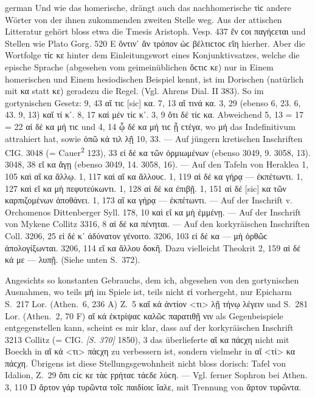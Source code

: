 \begin{otherlanguage*}{german}
Und wie das homerische, drängt auch das nachhomerische τὶϲ andere Wörter von der ihnen zukommenden zweiten Stelle weg. Aus der attischen Litteratur gehört bloss etwa die Tmesis Aristoph. Vesp. 437 ἔν  ϲοι παγήϲεται und Stellen wie Plato Gorg. 520 E ὅντιν᾽ ἄν  τρόπον ὡϲ βέλτιϲτοϲ εἴη hierher. Aber die Wortfolge τίϲ κε hinter dem Einleitungswort eines Konjunktivsatzes, welche die epische Sprache (abgesehen vom geimeinüblichen ὅϲτιϲ κε) nur in Einem homerischen und Einem hesiodischen Beispiel kennt, ist im Dorischen (natürlich mit κα statt κε) geradezu die Regel. (Vgl. Ahrens Dial. II 383). So im gortynischen Gesetz: 9, 43 αἴ τιϲ [sic] κα. 7, 13 αἴ τινά κα. 3, 29 (ebenso 6, 23. 6, 43. 9, 13) καἴ τί κ᾽. 8, 17 καί μέν τίϲ κ᾽. 3, 9 ὅτι δέ τίϲ κα. Abweichend 5, 13 = 17 = 22 αἰ δέ κα μή τιϲ und 4, 14 ᾧ δέ κα μή τιϲ ᾖ ϲτέγα, wo μή das Indefinitivum attrahiert hat, sowie ὁπῶ κά τιλ λῇ 10, 33. — Auf jüngern kretischen Inschriften CIG. 3048 (= Cauer\textsuperscript{2} 123), 33 εἰ δέ  κα τῶν ὁρμιωμένων (ebenso 3049, 9. 3058, 13). 3048, 38 εἴ  κα ἄγῃ (ebenso 3049, 14. 3058, 16). — Auf den Tafeln von Heraklea 1, 105 καὶ αἴ  κα ἄλλῳ. 1, 117 καὶ αἴ  κα ἄλλουϲ. 1, 119 αἰ δέ  κα γήρᾳ — ἐκπέτωντι. 1, 127 καὶ εἴ  κα μὴ πεφυτεύκωντι. 1, 128 αἰ δέ  κα ἐπιβῇ. 1, 151 αἰ δέ  [sic] κα τῶν καρπιζομένων ἀποθάνει. 1, 173 αἴ  κα γήρᾳ — ἐκπέτωντι. — Auf der Inschrift v. Orchomenos Dittenberger Syll. 178, 10 καὶ εἴ  κα μὴ ἐμμένῃ. — Auf der Inschrift von Mykene Collitz 3316, 8 αἰ δέ  κα πένηται. — Auf den korkyräischen Inschriften Coll. 3206, 25 εἰ δέ  κ᾽ ἀδύνατον γένοιτο. 3206, 103 εἰ δέ  κα — μὴ ὀρθῶϲ ἀπολογίξωνται. 3206, 114 εἴ  κα ἄλλου δοκῆ. Dazu vielleicht Theokrit 2, 159 αἰ δέ  κά με — λυπῇ. (Siehe unten S.~372).

Angesichts so konstanten Gebrauchs, dem ich, abgesehen von den gortynischen Ausnahmen, wo teils μή im Spiele ist, teils nicht εἰ vorhergeht, nur Epi\-charm S.~217 Lor. (Athen.~6, 236 A) Z.~5 καἴ κά  ἀντίον <τι> λῇ τήνῳ λέγειν und S.~281 Lor. (Athen.~2, 70 F) αἴ κά  ἐκτρίψαϲ καλῶϲ παρατιθῇ νιν als Gegenbeispiele entgegenstellen kann, scheint es mir klar, dass auf der korkyräischen Inschrift 3213 Collitz (= CIG. \hypertarget{p370}{\emph{[S. 370]}}\label{p370} 1850), 3 das überlieferte αἴ κα πάϲχη nicht mit Boeckh in αἴ κά <τι> πάϲχη zu verbessern ist, sondern vielmehr in αἴ <τί> κα πάϲχη. Übrigens ist diese Stellungsgewohnheit nicht bloss dorisch: Tafel von Idalion, Z.~29 ὄπι ϲίϲ κε τὰϲ ϝρήταϲ τάϲδε λύϲη. — Vgl. ferner Sophron bei Athen. 3, 110 D ἄρτον γάρ  τυρῶντα τοῖϲ παιδίοιϲ ἴαλε, mit Trennung von ἄρτον τυρῶντα.


\end{otherlanguage*}
